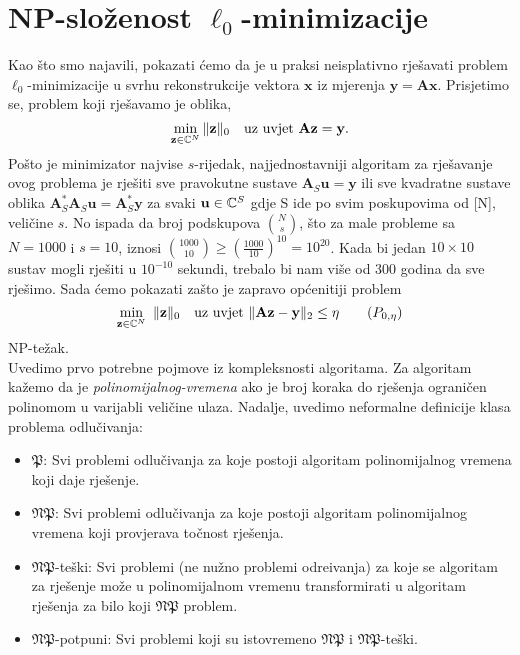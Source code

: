 \documentclass[a4paper,twoside,12pt]{memoir} %
\newcommand{\vect}[1]{\mathbf{#1}}
\renewcommand{\vec}{\vect}
\newcommand{\norm}[1]{\|{#1}\|}
\begin{document}
\section[NP-slo\v{z}enost $\mathbf{\ell_0}$-minimizacije][NP-slo\v{z}enost $\ell_0$-minimizacije]{NP-slo\v{z}enost $\ell_0$-minimizacije}
Kao \v{s}to smo najavili, pokazati \'cemo da je u praksi neisplativno rje\v{s}avati problem $\ell_0$-minimizacije u svrhu rekonstrukcije vektora $\vec x$ iz mjerenja $\vec y = \vec{Ax}$. Prisjetimo se, problem koji rje\v{s}avamo je oblika, 
\begin{equation*}
    \min_{\vec z \in \C^N} \norm{\vec z}_0 \quad \text{uz uvjet } \vec{Az}=\vec y. 
\end{equation*}
Po\v{s}to je minimizator najvise $s$-rijedak, najjednostavniji algoritam za rje\v{s}avanje ovog problema je rje\v{s}iti sve pravokutne sustave $\vec A_S \vec u = \vec y$ ili sve kvadratne sustave oblika $\vec A_S^* \vec A_S \vec u = \vec A_S^* \vec y$ za svaki $\vec u \in \C^S$ gdje S ide po svim poskupovima od [N], veli\v{c}ine $s$. No ispada da broj podskupova $N \choose s$, \v{s}to za male probleme sa $N = 1000$ i $s=10$, iznosi ${1000 \choose 10} \geq (\frac{1000}{10})^{10}=10^{20}$. Kada bi jedan $10 \times 10$ sustav mogli rje\v{s}iti u $10^{-10}$ sekundi, trebalo bi nam vi\v{s}e od 300 godina da sve rje\v{s}imo. Sada \'cemo pokazati za\v{s}to je zapravo op\'cenitiji problem
\begin{equation}
\min_{\vec z \in \C^N}\ \norm{\vec z}_0 \quad \text{uz uvjet }\norm{\vec{Az}- \vec{y}}_2 \leq \eta \tag{$P_{0, \eta}$}\label{problem_minimizacije_generalni}
\end{equation}
NP-te\v{z}ak.\\
\indent Uvedimo prvo potrebne pojmove iz kompleksnosti algoritama. Za algoritam ka\v{z}emo da je \textit{polinomijalnog-vremena} ako je broj koraka do rje\v{s}enja ograni\v{c}en polinomom u varijabli veli\v{c}ine ulaza. Nadalje, uvedimo neformalne definicije klasa problema odlu\v{c}ivanja:
\begin{itemize}
    \item $\mathfrak{P}$: Svi problemi odlu\v{c}ivanja za koje postoji algoritam polinomijalnog vremena koji daje rje\v{s}enje.
    \item $\mathfrak{NP}$: Svi problemi odlu\v{c}ivanja za koje postoji algoritam polinomijalnog vremena koji provjerava to\v{c}nost rje\v{s}enja.
    \item $\mathfrak{NP}$-te\v{s}ki: Svi problemi (ne nu\v{z}no problemi odre\dj ivanja) za koje se algoritam za rje\v{s}enje mo\v{z}e u polinomijalnom vremenu transformirati u algoritam rje\v{s}enja za bilo koji $\mathfrak{NP}$ problem.
    \item $\mathfrak{NP}$-potpuni: Svi problemi koji su istovremeno $\mathfrak{NP}$ i $\mathfrak{NP}$-te\v{s}ki.
\end{itemize}
\end{document}

